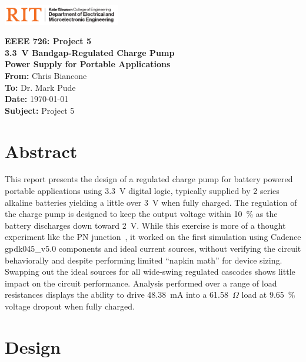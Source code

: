 \documentclass[11pt,letterpaper]{article}
\providecommand*{\upOmega}{\varOmega}   %
\begin{document}
\VerbatimFootnotes %


	\hspace{4.5in}
	\includegraphics[width=2in,trim=0cm 0in 0in 0.0in,clip]{images/COE_EME_1505C_hor_k1.pdf}
\newline

\Huge\textbf{EEEE 726: Project 5 \\\qty{3.3}{\V} Bandgap-Regulated Charge Pump\\Power Supply for Portable Applications}\\

\Large
\textbf{From:} Chris Biancone \\
\textbf{To: } Dr. Mark Pude \\
\textbf{Date: } \today \\
\textbf{Subject: } Project 5\\
\vspace{0.5in}

\section*{Abstract}
\normalsize
This report presents the design of a regulated charge pump for battery powered portable applications using \qty{3.3}{\V} digital logic, typically supplied by 2 series alkaline batteries yielding a little over \qty{3}{\V} when fully charged. The regulation of the charge pump is designed to keep the output voltage within \qty{10}{\%} as the battery discharges down toward \qty{2}{\V}. While this exercise is more of a thought experiment like the PN junction~\cite{Huang2024}, it worked on the first simulation using Cadence gpdk045\_v5.0 components and ideal current sources, without verifying the circuit behaviorally and despite performing limited ``napkin math'' for device sizing. Swapping out the ideal sources for all wide-swing regulated cascodes shows little impact on the circuit performance. Analysis performed over a range of load resistances displays the ability to drive \qty{48.38}{\mA} into a \qty{61.58}{\(\upOmega\)} load at \qty{9.65}{\%} voltage dropout when fully charged.

\section{Design}
\end{document}
